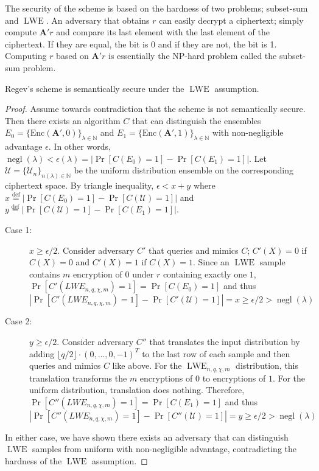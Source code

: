 The security of the scheme is based on the hardness of two problems; subset-sum and $\operatorname{LWE}$. An adversary that obtains $r$ can easily decrypt a ciphertext; simply compute $\textbf{A}'r$ and compare its last element with the last element of the ciphertext. If they are equal, the bit is 0 and if they are not, the bit is 1. Computing $r$ based on $\textbf{A}'r$ is essentially the NP-hard problem called the subset-sum problem.
\begin{claim}
    Regev's scheme is semantically secure under the $\operatorname{LWE}$ assumption.
\end{claim}
\begin{proof}
    Assume towards contradiction that the scheme is not semantically secure. Then there exists an algorithm $C$ that can distinguish the ensembles $E_0 = \{\text{Enc}(\textbf{A}',0)\}_{\lambda \in \mathbb{N}}$ and $E_1 = \{\text{Enc}(\textbf{A}',1)\}_{\lambda \in \mathbb{N}}$ with non-negligible advantage $\epsilon$. In other words, $ \operatorname{negl}(\lambda) < \epsilon(\lambda) = |\operatorname{Pr}[C(E_0) = 1] - \operatorname{Pr}[C(E_1) = 1]|$. Let $\mathcal{U} = \{\mathcal{U}_n\}_{n(\lambda) \in \mathbb{N}}$ be the uniform distribution ensemble on the corresponding ciphertext space. By triangle inequality, $\epsilon < x + y$ where $x \stackrel{\mathrm{def}}{=} |\operatorname{Pr}[C(E_0) = 1] - \operatorname{Pr}[C(\mathcal{U}) = 1]|$ and $y \stackrel{\mathrm{def}}{=} |\operatorname{Pr}[C(\mathcal{U}) = 1] - \operatorname{Pr}[C(E_1) = 1]|$.
    \begin{description}
        \item[Case 1:] $x \geq \epsilon / 2$. Consider adversary $C'$ that queries and mimics $C$; $C'(X) = 0$ if $C(X) = 0$ and $C'(X) = 1$ if $C(X) = 1$. Since an $\operatorname{LWE}$ sample contains $m$ encryption of $0$ under $r$ containing exactly one $1$, $\operatorname{Pr}[C'(LWE_{n,q,\chi,m}) = 1] = \operatorname{Pr}[C(E_0) = 1]$ and thus $|\operatorname{Pr}[C'(LWE_{n,q,\chi,m}) = 1] - \operatorname{Pr}[C'(\mathcal{U}) = 1]| = x \geq \epsilon / 2 > \operatorname{negl}(\lambda)$
        \item[Case 2:] $y \geq \epsilon / 2$. Consider adversary $C''$ that translates the input distribution by adding $\lfloor q/2 \rfloor \cdot (0, \dots, 0, -1)^T$ to the last row of each sample and then queries and mimics $C$ like above. For the $\operatorname{LWE}_{n,q,\chi,m}$ distribution, this translation transforms the $m$ encryptions of $0$ to encryptions of $1$. For the uniform distribution, translation does nothing. Therefore, $\operatorname{Pr}[C''(LWE_{n,q,\chi,m}) = 1] = \operatorname{Pr}[C(E_1) = 1]$ and thus $|\operatorname{Pr}[C''(LWE_{n,q,\chi,m}) = 1] - \operatorname{Pr}[C''(\mathcal{U}) = 1]| = y \geq \epsilon / 2 > \operatorname{negl}(\lambda)$
    \end{description}
    In either case, we have shown there exists an adversary that can distinguish $\operatorname{LWE}$ samples from uniform with non-negligible advantage, contradicting the hardness of the $\operatorname{LWE}$ assumption.
\end{proof}
